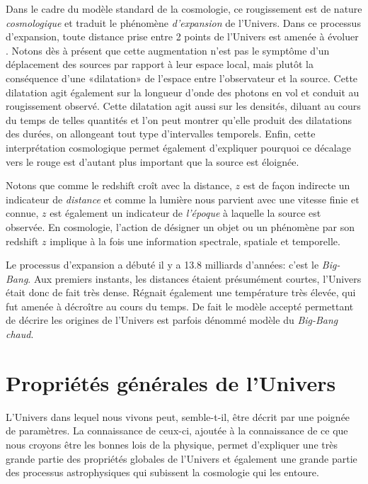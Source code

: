 Dans le cadre du modèle standard de la cosmologie, ce rougissement est de nature \textit{cosmologique} et traduit le phénomène \textit{d'expansion} de l'Univers. Dans ce processus d'expansion, toute distance prise entre 2 points de l'Univers est amenée à évoluer . Notons dès à présent que cette augmentation n'est pas le symptôme d'un déplacement des sources par rapport à leur espace local, mais plutôt la conséquence d'une «dilatation» de l'espace entre l'observateur et la source. Cette dilatation agit également sur la longueur d'onde des photons en vol et conduit au rougissement observé. Cette dilatation agit aussi sur les densités, diluant au cours du temps de telles quantités et l’on peut montrer qu'elle produit des dilatations des durées, on allongeant tout type d'intervalles temporels. Enfin, cette interprétation cosmologique permet également d'expliquer pourquoi ce décalage vers le rouge est d'autant plus important que la source est éloignée.

Notons que comme le redshift croît avec la distance, $z$ est de façon indirecte un indicateur de \textit{distance} et comme la lumière nous parvient avec une vitesse finie et connue, $z$ est également un indicateur de \textit{l'époque} à laquelle la source est observée. En cosmologie, l'action de désigner un objet ou un phénomène par son redshift $z$ implique à la fois une information spectrale, spatiale et temporelle.

Le processus d'expansion a débuté il y a 13.8 milliards d'années: c'est le \textit{Big-Bang}. Aux premiers instants, les distances étaient présumément courtes, l'Univers était donc de fait très dense. Régnait également une température très élevée, qui fut amenée à décroître au cours du temps. De fait le modèle accepté permettant de décrire les origines de l'Univers est parfois dénommé modèle du \textit{Big-Bang chaud}.

\section{Propriétés générales de l'Univers}
L'Univers dans lequel nous vivons peut, semble-t-il, être décrit par une poignée de paramètres. La connaissance de ceux-ci, ajoutée à la connaissance de ce que nous croyons être les bonnes lois de la physique, permet d'expliquer une très grande partie des propriétés globales de l'Univers et également une grande partie des processus astrophysiques qui subissent la cosmologie qui les entoure.  

